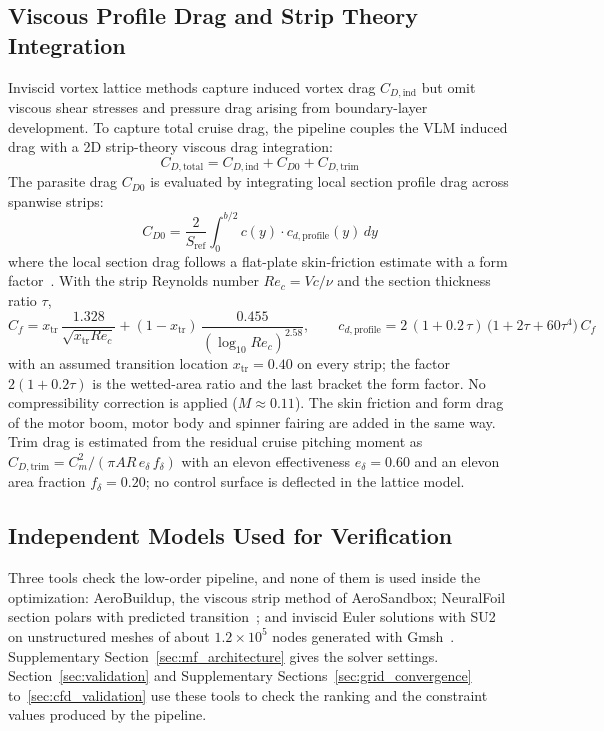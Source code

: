 \subsection{Viscous Profile Drag and Strip Theory Integration}
Inviscid vortex lattice methods capture induced vortex drag $C_{D,\mathrm{ind}}$ but omit viscous shear stresses and pressure drag arising from boundary-layer development. To capture total cruise drag, the pipeline couples the VLM induced drag with a 2D strip-theory viscous drag integration:
\begin{equation}
C_{D,\mathrm{total}} = C_{D,\mathrm{ind}} + C_{D0} + C_{D,\mathrm{trim}}
\end{equation}
The parasite drag $C_{D0}$ is evaluated by integrating local section profile drag across spanwise strips:
\begin{equation}
C_{D0} = \frac{2}{S_{\mathrm{ref}}} \int_0^{b/2} c(y) \cdot c_{d,\mathrm{profile}}(y) \, dy
\end{equation}
where the local section drag follows a flat-plate skin-friction estimate with a form factor~\cite{raymer2018aircraft}. With the strip Reynolds number $Re_c = V c / \nu$ and the section thickness ratio $\tau$,
\begin{equation}
C_f = x_{\mathrm{tr}}\,\frac{1.328}{\sqrt{x_{\mathrm{tr}} Re_c}} + (1 - x_{\mathrm{tr}})\,\frac{0.455}{(\log_{10} Re_c)^{2.58}}, \qquad c_{d,\mathrm{profile}} = 2\,(1 + 0.2\,\tau)\,\big(1 + 2\tau + 60\tau^4\big)\, C_f
\end{equation}
with an assumed transition location $x_{\mathrm{tr}} = 0.40$ on every strip; the factor $2(1 + 0.2\tau)$ is the wetted-area ratio and the last bracket the form factor. No compressibility correction is applied ($M \approx 0.11$). The skin friction and form drag of the motor boom, motor body and spinner fairing are added in the same way. Trim drag is estimated from the residual cruise pitching moment as $C_{D,\mathrm{trim}} = C_m^2 / (\pi A\!R\, e_{\delta}\, f_{\delta})$ with an elevon effectiveness $e_{\delta} = 0.60$ and an elevon area fraction $f_{\delta} = 0.20$; no control surface is deflected in the lattice model.

\subsection{Independent Models Used for Verification}
\label{sec:mf_tools}
Three tools check the low-order pipeline, and none of them is used inside the optimization: AeroBuildup, the viscous strip method of AeroSandbox; NeuralFoil section polars with predicted transition~\cite{sharpe2024neuralfoil}; and inviscid Euler solutions with SU2~\cite{economon2016su2} on unstructured meshes of about $1.2 \times 10^5$ nodes generated with Gmsh~\cite{geuzaine2009gmsh}. Supplementary Section~\ref{sec:mf_architecture} gives the solver settings. Section~\ref{sec:validation} and Supplementary Sections~\ref{sec:grid_convergence} to~\ref{sec:cfd_validation} use these tools to check the ranking and the constraint values produced by the pipeline.
